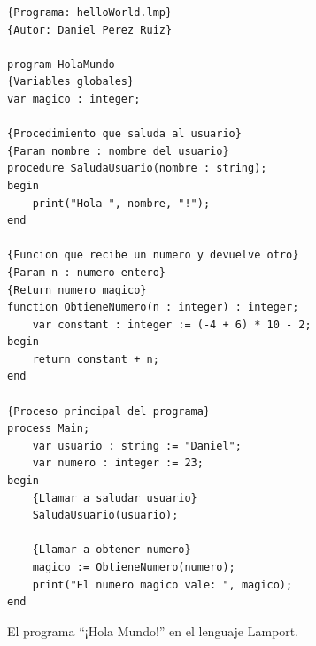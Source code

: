 \begin{figure}[h]
\begin{lstlisting}[style=lamportStyle]
{Programa: helloWorld.lmp}
{Autor: Daniel Perez Ruiz}

program HolaMundo
{Variables globales}
var magico : integer;

{Procedimiento que saluda al usuario}
{Param nombre : nombre del usuario}
procedure SaludaUsuario(nombre : string);
begin
    print("Hola ", nombre, "!");
end

{Funcion que recibe un numero y devuelve otro}
{Param n : numero entero}
{Return numero magico}
function ObtieneNumero(n : integer) : integer;
    var constant : integer := (-4 + 6) * 10 - 2;
begin
    return constant + n;
end

{Proceso principal del programa}
process Main;
    var usuario : string := "Daniel";
    var numero : integer := 23;
begin
    {Llamar a saludar usuario}
    SaludaUsuario(usuario);
	
    {Llamar a obtener numero}
    magico := ObtieneNumero(numero);
    print("El numero magico vale: ", magico);
end
\end{lstlisting}
\caption{El programa ``¡Hola Mundo!'' en el lenguaje Lamport.}
\label{fig:lamportHolaMundo}
\end{figure}

